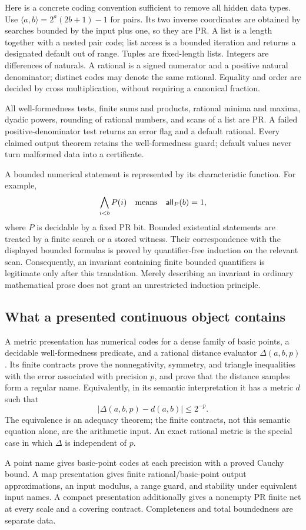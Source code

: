 Here is a concrete coding convention sufficient to remove all hidden data types. Use
\(\langle a,b\rangle=2^a(2b+1)-1\) for pairs. Its two inverse coordinates are obtained by searches bounded by the input plus one, so they are PR. A list is a length together with a nested pair code; list access is a bounded iteration and returns a designated default out of range. Tuples are fixed-length lists. Integers are differences of naturals. A rational is a signed numerator and a positive natural denominator; distinct codes may denote the same rational. Equality and order are decided by cross multiplication, without requiring a canonical fraction.

All well-formedness tests, finite sums and products, rational minima and maxima, dyadic powers, rounding of rational numbers, and scans of a list are PR. A failed positive-denominator test returns an error flag and a default rational. Every claimed output theorem retains the well-formedness guard; default values never turn malformed data into a certificate.

A bounded numerical statement is represented by its characteristic function. For example,
\[
  \bigwedge_{i<b}P(i)\quad\hbox{means}\quad
  \mathsf{all}_P(b)=1,
\]
where \(P\) is decidable by a fixed PR bit. Bounded existential statements are treated by a finite search or a stored witness. Their correspondence with the displayed bounded formulas is proved by quantifier-free induction on the relevant scan. Consequently, an invariant containing finite bounded quantifiers is legitimate only after this translation. Merely describing an invariant in ordinary mathematical prose does not grant an unrestricted induction principle.

\subsection{What a presented continuous object contains}

\begin{definition}\label{def:presentation}
A metric presentation has numerical codes for a dense family of basic points, a decidable well-formedness predicate, and a rational distance evaluator \(\Delta(a,b,p)\). Its finite contracts prove the nonnegativity, symmetry, and triangle inequalities with the error associated with precision \(p\), and prove that the distance samples form a regular name. Equivalently, in its semantic interpretation it has a metric \(d\) such that
\[
 |\Delta(a,b,p)-d(a,b)|\leq 2^{-p}.
\]
The equivalence is an adequacy theorem; the finite contracts, not this semantic equation alone, are the arithmetic input. An exact rational metric is the special case in which \(\Delta\) is independent of \(p\).

A point name gives basic-point codes at each precision with a proved Cauchy bound. A map presentation gives finite rational/basic-point output approximations, an input modulus, a range guard, and stability under equivalent input names. A compact presentation additionally gives a nonempty PR finite net at every scale and a covering contract. Completeness and total boundedness are separate data.
\end{definition}

